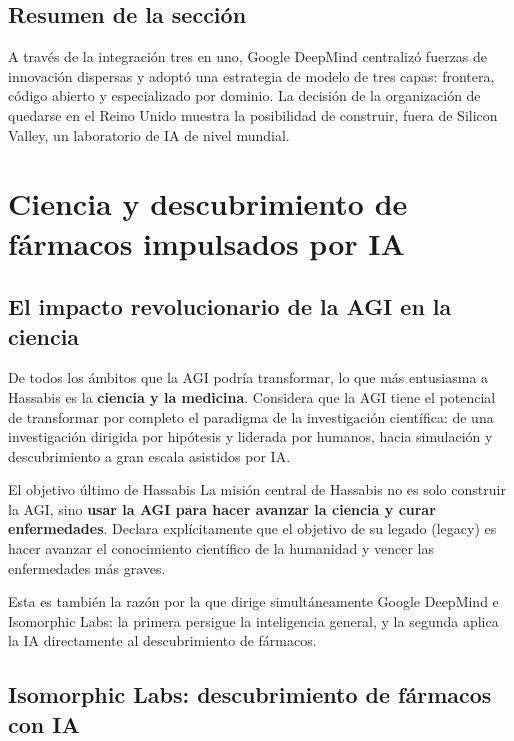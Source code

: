 \documentclass[a4paper]{article}
\begin{document}
\subsection{Resumen de la sección}

A través de la integración tres en uno, Google DeepMind centralizó fuerzas de innovación dispersas y adoptó una estrategia de modelo de tres capas: frontera, código abierto y especializado por dominio. La decisión de la organización de quedarse en el Reino Unido muestra la posibilidad de construir, fuera de Silicon Valley, un laboratorio de IA de nivel mundial.

\section{Ciencia y descubrimiento de fármacos impulsados por IA}

\subsection{El impacto revolucionario de la AGI en la ciencia}

De todos los ámbitos que la AGI podría transformar, lo que más entusiasma a Hassabis es la \textbf{ciencia y la medicina}. Considera que la AGI tiene el potencial de transformar por completo el paradigma de la investigación científica: de una investigación dirigida por hipótesis y liderada por humanos, hacia simulación y descubrimiento a gran escala asistidos por IA.

\begin{importantbox}{El objetivo último de Hassabis}
La misión central de Hassabis no es solo construir la AGI, sino \textbf{usar la AGI para hacer avanzar la ciencia y curar enfermedades}. Declara explícitamente que el objetivo de su legado (legacy) es hacer avanzar el conocimiento científico de la humanidad y vencer las enfermedades más graves.

Esta es también la razón por la que dirige simultáneamente Google DeepMind e Isomorphic Labs: la primera persigue la inteligencia general, y la segunda aplica la IA directamente al descubrimiento de fármacos.
\end{importantbox}

\subsection{Isomorphic Labs: descubrimiento de fármacos con IA}
\end{document}
